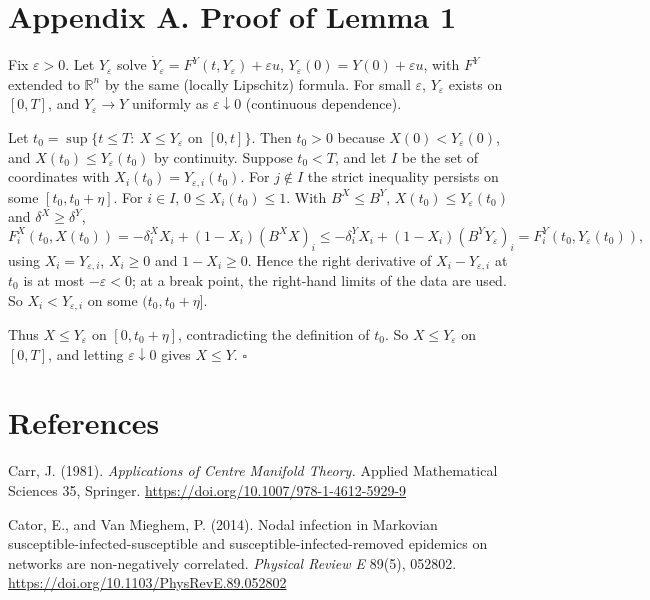 \documentclass[
  11pt,
  a4paper,
]{article}
\begin{document}
\section{Appendix A. Proof of Lemma
1}\label{appendix-a.-proof-of-lemma-1}

Fix \(\varepsilon>0\). Let \(Y_\varepsilon\) solve
\(\dot Y_\varepsilon=F^Y(t,Y_\varepsilon)+\varepsilon u\),
\(Y_\varepsilon(0)=Y(0)+\varepsilon u\), with \(F^Y\) extended to
\(\mathbb R^n\) by the same (locally Lipschitz) formula. For small
\(\varepsilon\), \(Y_\varepsilon\) exists on \([0,T]\), and
\(Y_\varepsilon\to Y\) uniformly as \(\varepsilon\downarrow0\)
(continuous dependence).

Let \(t_0=\sup\{t\le T:\ X\le Y_\varepsilon\text{ on }[0,t]\}\). Then
\(t_0>0\) because \(X(0)<Y_\varepsilon(0)\), and
\(X(t_0)\le Y_\varepsilon(t_0)\) by continuity. Suppose \(t_0<T\), and
let \(I\) be the set of coordinates with
\(X_i(t_0)=Y_{\varepsilon,i}(t_0)\). For \(j\notin I\) the strict
inequality persists on some \([t_0,t_0+\eta]\). For \(i\in I\),
\(0\le X_i(t_0)\le1\). With \(B^X\le B^Y\),
\(X(t_0)\le Y_\varepsilon(t_0)\) and \(\delta^X\ge\delta^Y\),
\[F^X_i(t_0,X(t_0))=-\delta^X_iX_i+(1-X_i)(B^XX)_i\le-\delta^Y_iX_i+(1-X_i)(B^YY_\varepsilon)_i=F^Y_i(t_0,Y_\varepsilon(t_0)),\]
using \(X_i=Y_{\varepsilon,i}\), \(X_i\ge0\) and \(1-X_i\ge0\). Hence
the right derivative of \(X_i-Y_{\varepsilon,i}\) at \(t_0\) is at most
\(-\varepsilon<0\); at a break point, the right-hand limits of the data
are used. So \(X_i<Y_{\varepsilon,i}\) on some \((t_0,t_0+\eta]\).

Thus \(X\le Y_\varepsilon\) on \([0,t_0+\eta]\), contradicting the
definition of \(t_0\). So \(X\le Y_\varepsilon\) on \([0,T]\), and
letting \(\varepsilon\downarrow0\) gives \(X\le Y\). \(\square\)

\section{References}\label{references}

Carr, J. (1981). \emph{Applications of Centre Manifold Theory.} Applied
Mathematical Sciences 35, Springer.
\url{https://doi.org/10.1007/978-1-4612-5929-9}

Cator, E., and Van Mieghem, P. (2014). Nodal infection in Markovian
susceptible-infected-susceptible and susceptible-infected-removed
epidemics on networks are non-negatively correlated. \emph{Physical
Review E} 89(5), 052802.
\url{https://doi.org/10.1103/PhysRevE.89.052802}
\end{document}
